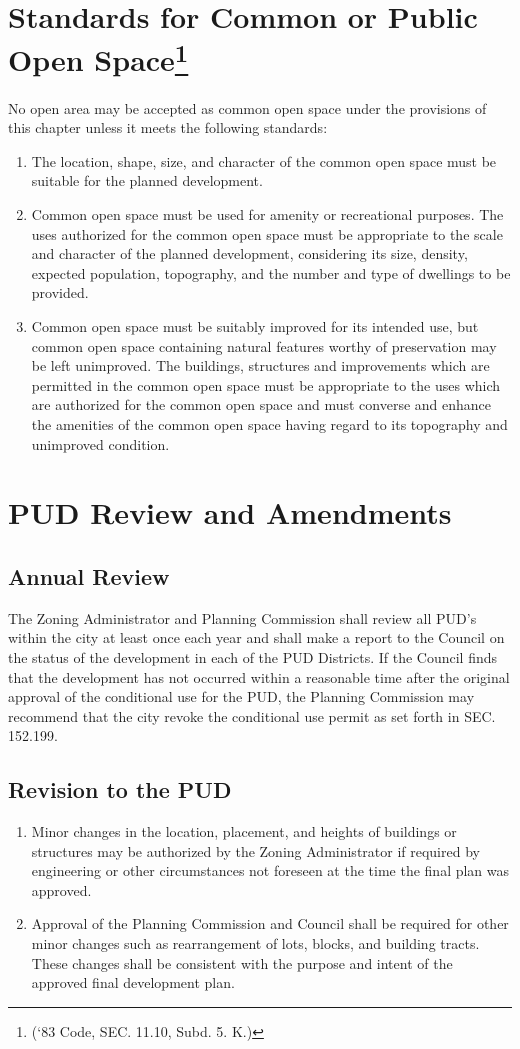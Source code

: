 \section{Standards for Common or Public Open Space\footnote{(‘83 Code, SEC. 11.10, Subd. 5. K.)}}
No open area may be accepted as common open space under the provisions of this chapter unless it meets the following standards:
\begin{enumerate}[{\indent}A)]
    \item The location, shape, size, and character of the common open space must be suitable for the planned development.
    \item Common open space must be used for amenity or recreational purposes. The uses authorized for the common open space must be appropriate to the scale and character of the planned development, considering its size, density, expected population, topography, and the number and type of dwellings to be provided.
    \item Common open space must be suitably improved for its intended use, but common open space containing natural features worthy of preservation may be left unimproved. The buildings, structures and improvements which are permitted in the common open space must be appropriate to the uses which are authorized for the common open space and must converse and enhance the amenities of the common open space having regard to its topography and unimproved condition.
\end{enumerate}
\section{PUD Review and Amendments}
\subsection{Annual Review}
The Zoning Administrator and Planning Commission shall review all PUD’s within the city at least once each year and shall make a report to the Council on the status of the development in each of the PUD Districts. If the Council finds that the development has not occurred within a reasonable time after the original approval of the conditional use for the PUD, the Planning Commission may recommend that the city revoke the conditional use permit as set forth in SEC. 152.199.
\subsection{Revision to the PUD}
\begin{enumerate}[{\indent}1)]
    \item Minor changes in the location, placement, and heights of buildings or structures may be authorized by the Zoning Administrator if required by engineering or other circumstances not foreseen at the time the final plan was approved.
    \item Approval of the Planning Commission and Council shall be required for other minor changes such as rearrangement of lots, blocks, and building tracts.  These changes shall be consistent with the purpose and intent of the approved final development plan.
\end{enumerate}
